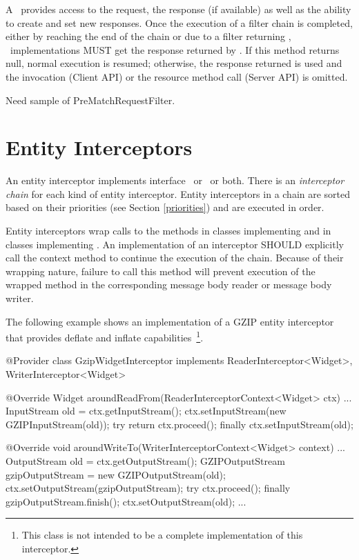 A \FilterContext\ provides access to the request, the response (if available) as well as the ability to create and set new responses. Once the execution of a filter chain is completed, either by reaching the end of the chain or due to a filter returning , \jaxrs\ implementations MUST get the response returned by . If this method returns null, normal execution is resumed; otherwise, the response returned is used and the invocation (Client API) or the resource method call (Server API) is omitted. 

\begin{ednote}
Need sample of PreMatchRequestFilter.
\end{ednote}

\section{Entity Interceptors}

An entity interceptor implements interface \ReaderInterceptor\ or \WriterInterceptor\ or both. There is an \emph{interceptor chain} for each kind of entity interceptor. Entity interceptors in a chain are sorted based on their priorities (see Section \ref{priorities}) and are executed in order. 

Entity interceptors wrap calls to the methods  in classes implementing  and  in classes implementing . An implementation of an interceptor SHOULD explicitly call the context method  to continue the execution of the chain. Because of their wrapping nature, failure to call this method will prevent execution of the wrapped method in the corresponding message body reader or message body writer.

The following example shows an implementation of a GZIP entity interceptor that provides deflate and inflate capabilities~\footnote{This class is not intended to be a complete implementation of this interceptor.}.

\begin{listing}{1}
@Provider
class GzipWidgetInterceptor implements 
    ReaderInterceptor<Widget>, WriterInterceptor<Widget> {

    @Override
    Widget aroundReadFrom(ReaderInterceptorContext<Widget> ctx) ... {
        InputStream old = ctx.getInputStream();
        ctx.setInputStream(new GZIPInputStream(old));
        try {
            return ctx.proceed();
        } finally {
            ctx.setInputStream(old);
        }
    }

    @Override
    void aroundWriteTo(WriterInterceptorContext<Widget> context) ... {
        OutputStream old = ctx.getOutputStream();
        GZIPOutputStream gzipOutputStream = new GZIPOutputStream(old);
        ctx.setOutputStream(gzipOutputStream);
        try {
            ctx.proceed();
        } finally {
            gzipOutputStream.finish();
            ctx.setOutputStream(old);
        }
    }
    ...
}
\end{listing}

